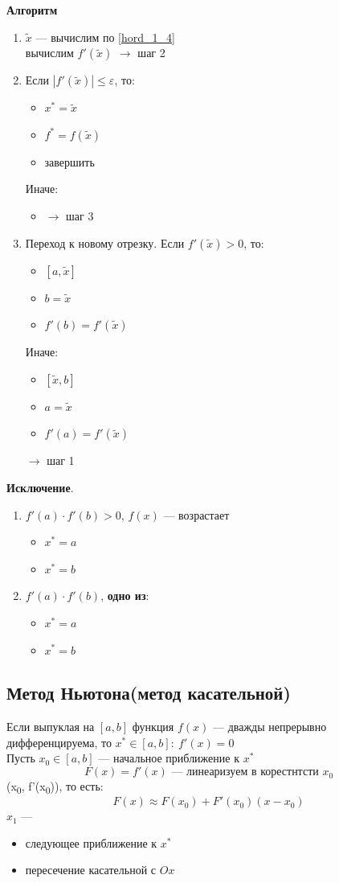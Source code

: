 \documentclass[oneside]{book}
\theoremstyle{plain}
\theoremstyle{remark}
\theoremstyle{definition}
\begin{document}
\textbf{Алгоритм}
\begin{enumerate}
\item \(\tilde{x}\) --- вычислим по \ref{hord_1_4} \\
вычислим \(f'(\tilde{x})\) \(\to\) шаг 2
\item Если \(|f'(\tilde{x})|\le\varepsilon\), то:
\begin{itemize}
\item \(x^* = \tilde{x}\)
\item \(f^* = f(\tilde{x})\)
\item завершить
\end{itemize}
Иначе:
\begin{itemize}
\item \(\to\) шаг 3
\end{itemize}
\item Переход к новому отрезку. Если \(f'(\tilde{x}) > 0\), то:
\begin{itemize}
\item \([a, \tilde{x}]\)
\item \(b = \tilde{x}\)
\item \(f'(b) = f'(\tilde{x})\)
\end{itemize}
Иначе:
\begin{itemize}
\item \([\tilde{x}, b]\)
\item \(a = \tilde{x}\)
\item \(f'(a) = f'(\tilde{x})\)
\end{itemize}
\(\to\) шаг 1
\end{enumerate}
\textbf{Исключение}.
\begin{enumerate}
\item \(f'(a)\cdot f'(b) > 0\), \(f(x)\) --- возрастает
\begin{itemize}
\item \(x^* = a\)
\item \(x^* = b\)
\end{itemize}
\item \(f'(a)\cdot f'(b)\), \textbf{одно из}:
\begin{itemize}
\item \(x^* = a\)
\item \(x^* = b\)
\end{itemize}
\end{enumerate}
\subsection{Метод Ньютона(метод касательной)}
\label{sec:org64ef893}
Если выпуклая на \([a, b]\) функция \(f(x)\) --- дважды непрерывно
дифференцируема, то \(x^* \in [a, b]:\ f'(x) = 0\) \\
Пусть \(x_0 \in [a, b]\) --- начальное приближение к \(x^*\)
\[ F(x) = f'(x)\text{ --- линеаризуем в корестнтсти } x_0 \]
(x\textsubscript{0}, f'(x\textsubscript{0})), то есть:
\[ F(x) \approx F(x_0) + F'(x_0)(x - x_0) \]
\(x_1\) ---
\begin{itemize}
\item следующее приближение к \(x^*\)
\item пересечение касательной с \(Ox\)
\end{itemize}
\end{document}

